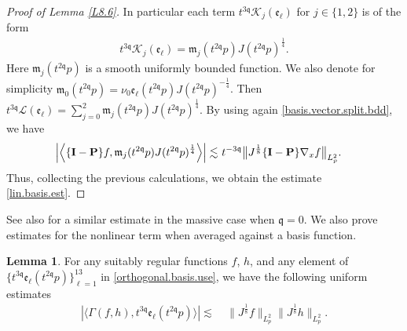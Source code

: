 \documentclass[reqno]{amsart}
\newcommand{\pv}{p}
\def\norm#1{\big\Vert#1\big\Vert}
\newcommand{\qq}{\mathfrak{q}}
\newcommand{\tqq}{t^{2\qq}}
\newcommand{\tTq}{t^{3\qq}}
\newcommand{\tmTq}{t^{-3\qq}}
\newcommand{\compK}{\mathcal{K}}
\newcommand{\linL}{\mathcal{L}}
\newcommand{\micro}{{\bf \{I- P\}}}
\theoremstyle{definition}
\newtheorem{lemma}[theorem]{Lemma}
\numberwithin{equation}{section}
\numberwithin{theorem}{section}
\begin{document}
\begin{proof}[Proof of Lemma \ref{L8.6}]
In particular each term $\tTq\compK_j (\mathfrak{e}_{\ell})$ for $j\in \{1,2\}$ is of the form 
\begin{align*}
 \tTq\compK_j (\mathfrak{e}_{\ell})
 =
 \mathfrak{m}_{j}(\tqq \pv) J(\tqq\pv)^{\frac14}.
\end{align*}
Here $\mathfrak{m}_{j}(\tqq \pv)$ is a smooth uniformly bounded function.  We also denote for simplicity $\mathfrak{m}_{0}(\tqq \pv) = \nu_0 \mathfrak{e}_{\ell}(\tqq \pv) J(\tqq\pv)^{-\frac14}$.  Then $\tTq \linL( \mathfrak{e}_{\ell}) = \sum_{j=0}^2 \mathfrak{m}_{j}(\tqq \pv)J(\tqq\pv)^{\frac14}$.  By using again \eqref{basis.vector.split.bdd}, we have 
\begin{align*}
   \left| \left\langle \micro  f, \mathfrak{m}_{j}(\tqq \pv)J(\tqq\pv)^{\frac14}\right\rangle \right|
        \lesssim &~ \tmTq \norm{J^{\frac{1}{8}} \micro  \nabla_x f}_{L^2_{\pv}}.
\end{align*}
Thus, collecting the previous calculations, we obtain the estimate \eqref{lin.basis.est}.  
\end{proof}

See also \cite[Lemma 6.6]{RelBolNoncut2020} for a similar estimate in the massive case when \(\qq=0\).  We also prove estimates for the nonlinear term when averaged against a basis function.


\begin{lemma}
	\label{L8.7} 
    For any suitably regular functions \(f\), \(h\), and any element of $\{\tTq \mathfrak{e}_{\ell}(\tqq \pv)\}_{\ell=1}^{13}$ in \eqref{orthogonal.basis.use},  we have the following uniform estimates
    \begin{align*}
    	\left| \langle   \Gamma(f,h),\tTq \mathfrak{e}_{\ell}(\tqq \pv)\rangle \right|
        \lesssim &~
\| J^{\frac{1}{8}} f\|_{L^2_{\pv}} \| J^{\frac{1}{8}} h\|_{L^2_{\pv}}.
\end{align*}
\end{lemma}
\end{document}

